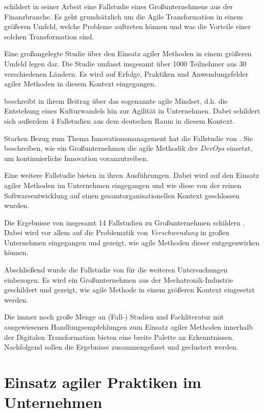  schildert in seiner Arbeit eine Fallstudie eines Großunternehmens aus der Finanzbranche. Es geht grundsätzlich um die Agile Transformation in einem größeren Umfeld, welche Probleme auftreten können und was die Vorteile einer solchen Transformation sind.

Eine großangelegte Studie über den Einsatz agiler Methoden in einem größeren Umfeld legen  dar. Die Studie umfasst insgesamt über 1000 Teilnehmer aus 30 verschiedenen Ländern. Es wird auf Erfolge, Praktiken und Anwendungsfelder agiler Methoden in diesem Kontext eingegangen.

 beschreibt in ihrem Beitrag über das sogenannte agile Mindset, d.h. die Entstehung eines Kulturwandels hin zur Agilität in Unternehmen. Dabei schildert sich außerdem 4 Fallstudien aus dem deutschen Raum in diesem Kontext. 

Starken Bezug zum Thema Innovationsmanagement hat die Fallstudie von . Sie beschreiben, wie ein Großunternehmen die agile Methodik der \textit{DevOps} einsetzt, um kontinuierliche Innovation voranzutreiben.

Eine weitere Fallstudie bieten  in ihren Ausführungen. Dabei wird auf den Einsatz agiler Methoden im Unternehmen eingegangen und wie diese von der reinen Softwareentwicklung auf einen gesamtorganisationellen Kontext geschlossen wurden.

Die Ergebnisse von insgesamt 14 Fallstudien zu Großunternehmen schildern . Dabei wird vor allem auf die Problematik von \textit{Verschwendung} in großen Unternehmen eingegangen und gezeigt, wie agile Methoden dieser entgegenwirken können.

Abschließend wurde die Fallstudie von  für die weiteren Untersuchungen einbezogen. Es wird ein Großunternehmen aus der Mechatronik-Industrie geschildert und gezeigt, wie agile Methode in einem größeren Kontext eingesetzt werden. 

Die immer noch große Menge an (Fall-) Studien und Fachliteratur mit ausgewiesenen Handlungsempfehlungen zum Einsatz agiler Methoden innerhalb der Digitalen Transformation bieten eine breite Palette an Erkenntnissen. Nachfolgend sollen die Ergebnisse zusammengefasst und geclustert werden.

\section{Einsatz agiler Praktiken im Unternehmen}
\label{agilepractices:extractions}

